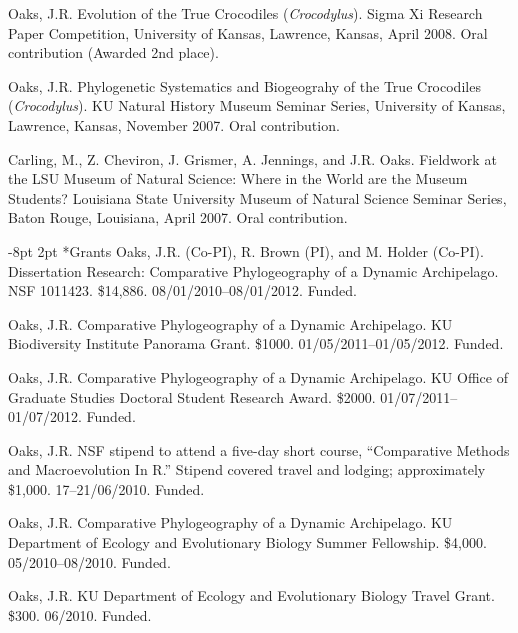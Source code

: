 \documentclass[10pt]{article}
\makeatletter
\newcommand{\ignore}[1]{}
\renewcommand{\section}{\@startsection{section}{1}{0mm}%
    {-8pt}%
    {2pt}%
   {\bfseries\large}}
\makeatother
\begin{document}
\hangindent=5mm
Oaks, J.R.
Evolution of the True Crocodiles (\emph{Crocodylus}).
Sigma Xi Research Paper Competition, University of Kansas, Lawrence, Kansas, April 2008.
Oral contribution (Awarded 2nd place).

\hangindent=5mm
Oaks, J.R.
Phylogenetic Systematics and Biogeograhy of the True Crocodiles (\emph{Crocodylus}).
KU Natural History Museum Seminar Series, University of Kansas, Lawrence, Kansas, November 2007.
Oral contribution.

\hangindent=5mm
Carling, M., Z. Cheviron, J. Grismer, A. Jennings, and J.R. Oaks.
Fieldwork at the LSU Museum of Natural Science: Where in the World are the Museum Students?
Louisiana State University Museum of Natural Science Seminar Series, Baton Rouge, Louisiana, April 2007.
Oral contribution.

\section*{Grants}
\hangindent=5mm
Oaks, J.R. (Co-PI), R. Brown (PI), and M. Holder (Co-PI).
Dissertation Research: Comparative Phylogeography of a Dynamic Archipelago.
NSF 1011423.
\$14,886.
08/01/2010--08/01/2012.
Funded.

\hangindent=5mm
Oaks, J.R.
Comparative Phylogeography of a Dynamic Archipelago.
KU Biodiversity Institute Panorama Grant.
\$1000.
01/05/2011--01/05/2012.
Funded.

\hangindent=5mm
Oaks, J.R.
Comparative Phylogeography of a Dynamic Archipelago.
KU Office of Graduate Studies Doctoral Student Research Award.
\$2000.
01/07/2011--01/07/2012.
Funded.

\ignore{
\hangindent=5mm
Oaks, J.R.
Comparative Phylogeography of a Dynamic Archipelago.
The Society for the Study of Evolution Rosemary Grant Graduate Research Award.
\$2,085.
01/07/2010--01/07/2011.
Not funded.
}
\hangindent=5mm
Oaks, J.R.
NSF stipend to attend a five-day short course, ``Comparative Methods and Macroevolution In R.''
Stipend covered travel and lodging; approximately \$1,000.
17--21/06/2010.
Funded.

\ignore{
\hangindent=5mm
Oaks, J.R.
Comparative Phylogeography of a Dynamic Archipelago.
KU Graduate Studies Summer Research Fellowship.
\$4,000.
05/2010--08/2010.
Not funded.
}
\hangindent=5mm
Oaks, J.R.
Comparative Phylogeography of a Dynamic Archipelago.
KU Department of Ecology and Evolutionary Biology Summer Fellowship.
\$4,000.
05/2010--08/2010.
Funded.

\hangindent=5mm
Oaks, J.R.
KU Department of Ecology and Evolutionary Biology Travel Grant.
\$300.
06/2010.
Funded.
\end{document}
